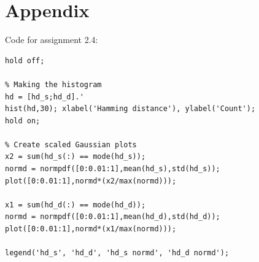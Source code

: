 \documentclass{article}
\begin{document}
\section*{Appendix}
Code for assignment 2.4:
\begin{lstlisting}
hold off;

% Making the histogram
hd = [hd_s;hd_d].'
hist(hd,30); xlabel('Hamming distance'), ylabel('Count');
hold on;

% Create scaled Gaussian plots
x2 = sum(hd_s(:) == mode(hd_s));
normd = normpdf([0:0.01:1],mean(hd_s),std(hd_s));
plot([0:0.01:1],normd*(x2/max(normd)));

x1 = sum(hd_d(:) == mode(hd_d));
normd = normpdf([0:0.01:1],mean(hd_d),std(hd_d));
plot([0:0.01:1],normd*(x1/max(normd)));

legend('hd_s', 'hd_d', 'hd_s normd', 'hd_d normd');
\end{lstlisting}
\end{document}
